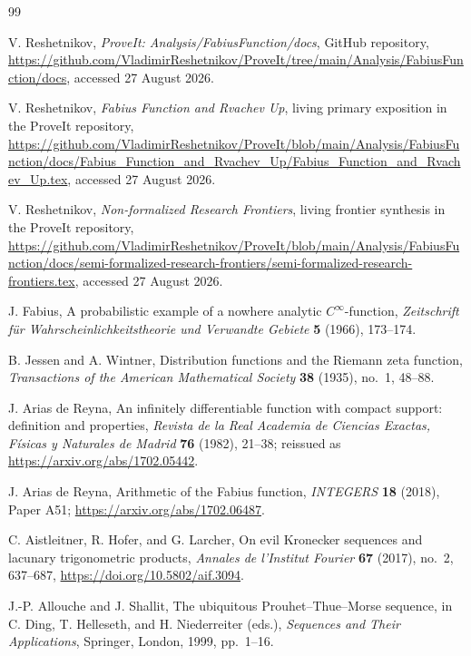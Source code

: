 \documentclass[11pt,oneside]{article}
\theoremstyle{definition}
\theoremstyle{remark}
\begin{document}
\begin{thebibliography}{99}

V. Reshetnikov,
\emph{ProveIt: Analysis/FabiusFunction/docs}, GitHub repository,
\url{https://github.com/VladimirReshetnikov/ProveIt/tree/main/Analysis/FabiusFunction/docs},
accessed 27 August 2026.

V. Reshetnikov,
\emph{Fabius Function and Rvachev Up}, living primary exposition in the ProveIt repository,
\url{https://github.com/VladimirReshetnikov/ProveIt/blob/main/Analysis/FabiusFunction/docs/Fabius_Function_and_Rvachev_Up/Fabius_Function_and_Rvachev_Up.tex},
accessed 27 August 2026.

V. Reshetnikov,
\emph{Non-formalized Research Frontiers}, living frontier synthesis in the ProveIt repository,
\url{https://github.com/VladimirReshetnikov/ProveIt/blob/main/Analysis/FabiusFunction/docs/semi-formalized-research-frontiers/semi-formalized-research-frontiers.tex},
accessed 27 August 2026.

J. Fabius,
A probabilistic example of a nowhere analytic $C^\infty$-function,
\emph{Zeitschrift f\"ur Wahrscheinlichkeitstheorie und Verwandte Gebiete}
\textbf{5} (1966), 173--174.

B. Jessen and A. Wintner,
Distribution functions and the Riemann zeta function,
\emph{Transactions of the American Mathematical Society}
\textbf{38} (1935), no.~1, 48--88.

J. Arias de Reyna,
An infinitely differentiable function with compact support: definition and properties,
\emph{Revista de la Real Academia de Ciencias Exactas, F\'isicas y Naturales de Madrid}
\textbf{76} (1982), 21--38;
reissued as \url{https://arxiv.org/abs/1702.05442}.

J. Arias de Reyna,
Arithmetic of the Fabius function,
\emph{INTEGERS} \textbf{18} (2018), Paper A51;
\url{https://arxiv.org/abs/1702.06487}.

C. Aistleitner, R. Hofer, and G. Larcher,
On evil Kronecker sequences and lacunary trigonometric products,
\emph{Annales de l'Institut Fourier} \textbf{67} (2017), no.~2, 637--687,
\url{https://doi.org/10.5802/aif.3094}.

J.-P. Allouche and J. Shallit,
The ubiquitous Prouhet--Thue--Morse sequence,
in C. Ding, T. Helleseth, and H. Niederreiter (eds.),
\emph{Sequences and Their Applications}, Springer, London, 1999, pp.~1--16.


\end{thebibliography}
\end{document}
